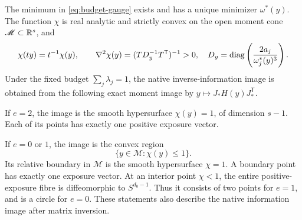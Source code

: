 \begin{theorem}\label{thm:budget}
The minimum in \eqref{eq:budget-gauge} exists and has a unique minimizer $\omega^*(y)$. The function $\chi$ is real analytic and strictly convex on the open moment cone $\mathscr M\subset\mathbb R^s$, and
\begin{equation}\label{eq:budget-hessian}
 \chi(ty)=t^{-1}\chi(y),\qquad
 \nabla^2\chi(y)=(TD_y^{-1}T^{\mathsf T})^{-1}>0,
 \quad D_y=\operatorname{diag}\left(\frac{2a_j}{\omega_j^*(y)^3}\right).
\end{equation}
Under the fixed budget $\sum_j\lambda_j=1$, the native inverse-information image is obtained from the following exact moment image by $y\mapsto J_*H(y)J_*^{\mathsf T}$.

If $e=2$, the image is the smooth hypersurface $\chi(y)=1$, of dimension $s-1$. Each of its points has exactly one positive exposure vector.

If $e=0$ or $1$, the image is the convex region
\begin{equation}\label{eq:budget-region}
 \{y\in\mathscr M:\chi(y)\le1\}.
\end{equation}
Its relative boundary in $\mathscr M$ is the smooth hypersurface $\chi=1$. A boundary point has exactly one exposure vector. At an interior point $\chi<1$, the entire positive-exposure fibre is diffeomorphic to $S^{d_0-1}$. Thus it consists of two points for $e=1$, and is a circle for $e=0$. These statements also describe the native information image after matrix inversion.
\end{theorem}
